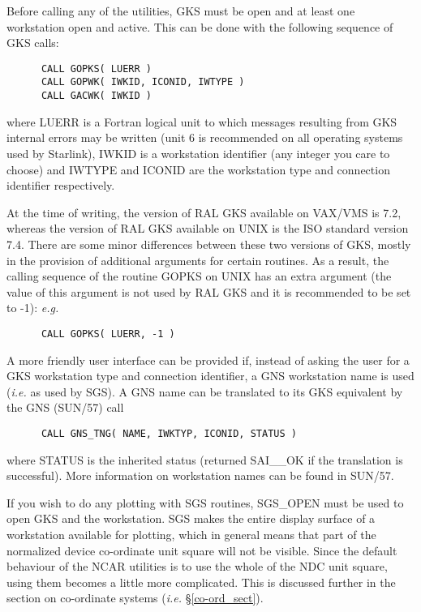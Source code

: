 Before calling any of the utilities, GKS must be open and at least one
workstation open and active. 
This can be done with the following sequence of GKS calls:

\begin{verbatim}
      CALL GOPKS( LUERR )
      CALL GOPWK( IWKID, ICONID, IWTYPE )
      CALL GACWK( IWKID )
\end{verbatim}

where LUERR is a Fortran logical unit to which messages resulting from
GKS internal errors may be written (unit 6 is recommended on all operating
systems used by Starlink), IWKID is a workstation identifier (any integer you
care to choose) and IWTYPE and ICONID are the workstation type and connection
identifier respectively.

At the time of writing, the version of RAL GKS available on VAX/VMS
is 7.2, whereas the version of RAL GKS available on UNIX is the ISO standard
version 7.4. 
There are some minor differences between these two versions of GKS, mostly 
in the provision of additional arguments for certain routines.
As a result, the calling sequence of the routine GOPKS on UNIX has an extra
argument (the value of this argument is not used by RAL GKS
and it is recommended to be set to -1): {\em e.g.} 

\begin{verbatim}
      CALL GOPKS( LUERR, -1 )
\end{verbatim}

A more friendly user interface can be provided if, instead of asking the
user for a GKS workstation type and connection identifier, a GNS workstation
name is used ({\em i.e.} as used by SGS).
A GNS name can be translated to its GKS equivalent by the GNS (SUN/57) call

\begin{verbatim}
      CALL GNS_TNG( NAME, IWKTYP, ICONID, STATUS )
\end{verbatim}

where STATUS is the inherited status (returned SAI\_\_OK if the translation is 
successful). 
More information on workstation names can be found in SUN/57.

If you wish to do any plotting with SGS routines, SGS\_OPEN must be used to
open GKS and the workstation.
SGS makes the entire display surface of a workstation available for plotting,
which in general means that part of the normalized device co-ordinate unit
square will not be visible.
Since the default behaviour of the NCAR utilities is to use the whole of the
NDC unit square, using them becomes a little more complicated.
This is discussed further in the section on co-ordinate systems
({\em i.e.} \S\ref{co-ord_sect}).

